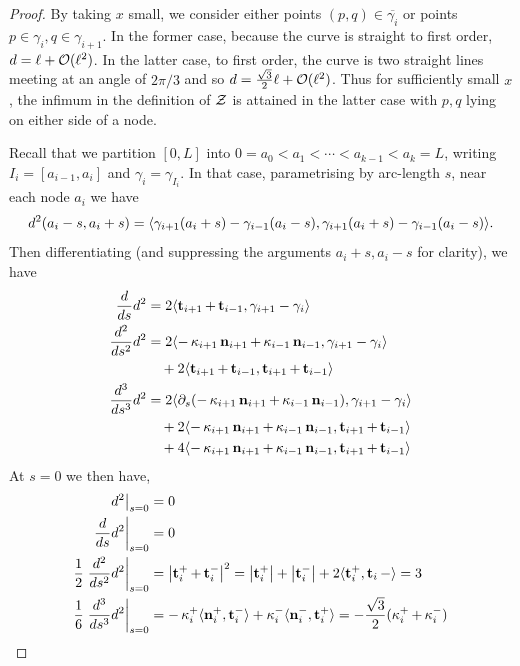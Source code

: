 \documentclass[11pt]{amsart}
\begin{document}
\begin{proof}
By taking $x$ small, we consider either points $(p,q) \in \overline{\gamma_i}$ or points $p \in \gamma_i, q \in \gamma_{i+1}$. In the former case, because the curve is straight to first order, $d = \ell + \operatorname{\mathcal{O}}(\ell^2)$. In the latter case, to first order, the curve is two straight lines meeting at an angle of $2\pi/3$ and so $d = \tfrac{\sqrt{3}}{2} \ell + \operatorname{\mathcal{O}}(\ell^2)$. Thus for sufficiently small $x$, the infimum in the definition of $\operatorname{\mathcal{Z}}$ is attained in the latter case with $p,q$ lying on either side of a node.

Recall that we partition \([0, L]\) into \(0 = a_0 < a_1 < \cdots < a_{k-1} < a_k = L\), writing \(I_i = [a_{i-1}, a_i]\) and \(\gamma_i = \gamma_{I_i}\). In that case, parametrising by arc-length $s$, near each node $a_i$ we have
\[
d^2(a_i - s, a_i + s) = \langle{\gamma_{i+1}(a_i + s) - \gamma_{i-1}(a_i - s)},{\gamma_{i+1}(a_i + s) - \gamma_{i-1}(a_i - s)}\rangle.
\]
Then differentiating (and suppressing the arguments \(a_i + s, a_i - s\) for clarity), we have
\begin{align*}
\frac{d}{ds} d^2 &= 2 \langle{\operatorname{\mathbf{t}}_{i+1} + \operatorname{\mathbf{t}}_{i-1}},{\gamma_{i+1} - \gamma_i}\rangle \\
\frac{d^2}{ds^2} d^2 &= 2 \langle{-\operatorname{\kappa}_{i+1} \operatorname{\mathbf{n}}_{i+1} + \operatorname{\kappa}_{i-1} \operatorname{\mathbf{n}}_{i-1}},{\gamma_{i+1} - \gamma_i}\rangle \\
&\quad + 2 \langle{\operatorname{\mathbf{t}}_{i+1} + \operatorname{\mathbf{t}}_{i-1}},{\operatorname{\mathbf{t}}_{i+1} + \operatorname{\mathbf{t}}_{i-1}}\rangle \\
\frac{d^3}{ds^3} d^2 &= 2 \langle{\partial_s(-\operatorname{\kappa}_{i+1} \operatorname{\mathbf{n}}_{i+1}  + \operatorname{\kappa}_{i-1} \operatorname{\mathbf{n}}_{i-1} )},{\gamma_{i+1}  - \gamma_i}\rangle \\
&\quad + 2 \langle{-\operatorname{\kappa}_{i+1} \operatorname{\mathbf{n}}_{i+1}  + \operatorname{\kappa}_{i-1} \operatorname{\mathbf{n}}_{i-1} },{\operatorname{\mathbf{t}}_{i+1} + \operatorname{\mathbf{t}}_{i-1}}\rangle \\
&\quad + 4 \langle{-\operatorname{\kappa}_{i+1} \operatorname{\mathbf{n}}_{i+1}  + \operatorname{\kappa}_{i-1} \operatorname{\mathbf{n}}_{i-1} },{\operatorname{\mathbf{t}}_{i+1} + \operatorname{\mathbf{t}}_{i-1}}\rangle
\end{align*}
At \(s = 0\) we then have,
\begin{align*}
\left. d^2 \right|_{s=0} &= 0 \\
\left.\frac{d}{ds} d^2\right|_{s=0} &= 0 \\
\frac{1}{2} \left.\frac{d^2}{ds^2} d^2 \right|_{s=0} &= \left|\operatorname{\mathbf{t}}_i^+ + \operatorname{\mathbf{t}}_i^-\right|^2 = \left|\operatorname{\mathbf{t}}_i^+\right| + \left|\operatorname{\mathbf{t}}_i^-\right| + 2\langle{\operatorname{\mathbf{t}}_i^+},{\operatorname{\mathbf{t}}_i-}\rangle = 3 \\
\frac{1}{6} \left.\frac{d^3}{ds^3} d^2 \right|_{s=0} &= -\operatorname{\kappa}_i^+ \langle{\operatorname{\mathbf{n}}_i^+},{\operatorname{\mathbf{t}}_i^-}\rangle + \operatorname{\kappa}_i^- \langle{\operatorname{\mathbf{n}}_i^-},{\operatorname{\mathbf{t}}_i^+}\rangle = -\frac{\sqrt{3}}{2} (\operatorname{\kappa}_i^+ + \operatorname{\kappa}_i^-) \\
\end{align*}


\end{proof}
\end{document}
